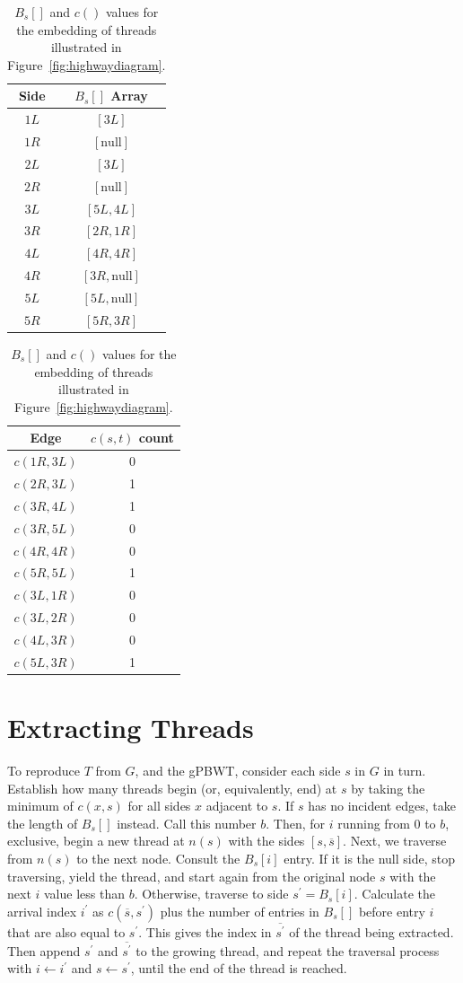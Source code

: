 \begin{table}[h!]
\caption{$B_s[]$ and $c()$ values for the embedding of threads illustrated in Figure~\ref{fig:highwaydiagram}.}
\label{tbl:barrays}
\centering
\begin{tabular} { c | c }
Side & $B_s[]$ Array \\
\hline
$1L$ & $[3L]$ \\
$1R$ & $[\mathrm{null}]$ \\
$2L$ & $[3L]$ \\
$2R$ & $[\mathrm{null}]$ \\
$3L$ & $[5L, 4L]$ \\
$3R$ & $[2R, 1R]$ \\
$4L$ & $[4R, 4R]$ \\
$4R$ & $[3R, \mathrm{null}]$ \\
$5L$ & $[5L, \mathrm{null}]$ \\
$5R$ & $[5R, 3R]$ \\
\end{tabular}
\begin{tabular}{ c | c }
Edge & $c(s, t)$ count \\
\hline
$c(1R, 3L)$ & 0 \\
$c(2R, 3L)$ & 1 \\
$c(3R, 4L)$ & 1 \\
$c(3R, 5L)$ & 0 \\
$c(4R, 4R)$ & 0 \\
$c(5R, 5L)$ & 1 \\
$c(3L, 1R)$ & 0 \\
$c(3L, 2R)$ & 0 \\
$c(4L, 3R)$ & 0 \\
$c(5L, 3R)$ & 1 \\
\end{tabular}

\end{table}


\section{Extracting Threads}

To reproduce $T$ from $G$, and the gPBWT, consider each side $s$ in $G$ in turn. Establish how many threads begin (or, equivalently, end) at $s$ by taking the minimum of $c(x, s)$ for all sides $x$ adjacent to $s$. If $s$ has no incident edges, take the length of $B_s[]$ instead. Call this number $b$. Then, for $i$ running from 0 to $b$, exclusive, begin a new thread at $n(s)$ with the sides $[s, \overline{s}]$. Next, we traverse from $n(s)$ to the next node. Consult the $B_s[i]$ entry. If it is the null side, stop traversing, yield the thread, and start again from the original node $s$ with the next $i$ value less than $b$. Otherwise, traverse to side $s^\prime = B_s[i]$. Calculate the arrival index $i^\prime$ as $c(\overline{s}, s^\prime)$ plus the number of entries in $B_s[]$ before entry $i$ that are also equal to $s^\prime$. This gives the index in $\overline{s^\prime}$ of the thread being extracted.  Then append $s^\prime$ and $\overline{s^\prime}$ to the growing thread, and repeat the traversal process with $i \leftarrow i^\prime$ and $s \leftarrow s^\prime$, until the end of the thread is reached. 

